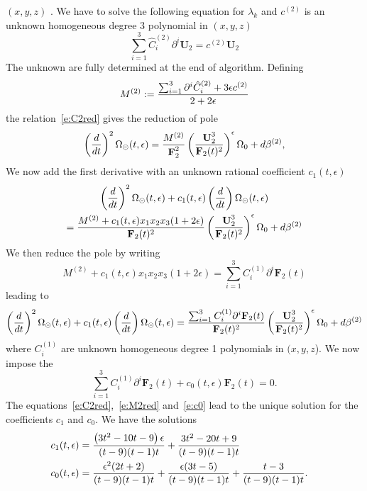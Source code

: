 \documentclass[a4paper,12pt]{article}
\numberwithin{equation}{section}
\numberwithin{figure}{section}
\def\su{\circleddash}
\begin{document}
$(x,y,z)$ .
We have to solve the following equation for $\lambda_k$  and $c^{(2)}$ is an unknown homogeneous degree 3 polynomial
in $(x,y,z)$
\begin{equation}\label{e:C2red}
  \sum_{i=1}^3 \hat C_i^{(2)} \partial^i \textbf{U}_2 = c^{(2)} \textbf{U}_2
\end{equation}
The unknown are fully determined at the end of  algorithm.
Defining 
\begin{equation}
  \label{e:M2}
  M^{(2)}:={\sum_{i=1}^3 \partial^i \hat C_i^{(2)}+3\epsilon
    c^{(2)}\over 2+2\epsilon}
\end{equation}
the relation~\eqref{e:C2red} gives the reduction of pole
\begin{equation}
 \left(d\over dt\right)^2
 \Omega_\su(t,\epsilon)=
{M^{(2)}\over
     \textbf{F}_2^{2}}\left(\textbf{U}_2^3\over \textbf{F}_2(t)^2\right)^\epsilon \Omega_0+d\beta^{(2)},
 \end{equation}
%
We now add the first derivative with an unknown rational coefficient $c_1(t,\epsilon)$
\begin{multline}
 \left(d\over dt\right)^2
 \Omega_\su(t,\epsilon) +c_1(t,\epsilon) \left(d\over dt\right)
 \Omega_\su(t,\epsilon) \cr=
{M^{(2)}+c_1(t,\epsilon) x_1x_2x_3(1+2\epsilon)\over
     \textbf{F}_2(t)^{2}}\left(\textbf{U}_2^3\over \textbf{F}_2(t)^2\right)^\epsilon \Omega_0+d\beta^{(2)}
 \end{multline}
 We then reduce the pole by writing
 \begin{equation}\label{e:M2red}
   M^{(2)}+ c_1(t,\epsilon) x_1x_2x_3(1+2\epsilon)= \sum_{i=1}^3
   C_i^{(1)} \partial^i \textbf{F}_2(t)
 \end{equation}
leading to
\begin{equation}
 \left(d\over dt\right)^2
 \Omega_\su(t,\epsilon) +c_1(t,\epsilon) \left(d\over dt\right)
 \Omega_\su(t,\epsilon) =
{ \sum_{i=1}^3
   C_i^{(1)} \partial^i \textbf{F}_2(t)\over
     \textbf{F}_2(t)^{2}}\left(\textbf{U}_2^3\over \textbf{F}_2(t)^2\right)^\epsilon \Omega_0+d\beta^{(2)}
 \end{equation}
 where $ C_i^{(1)}$ are unknown homogeneous degree 1 polynomials in $(x,y,z$).
We now impose the 
\begin{equation}\label{e:c0}
  \sum_{i=1}^3C_i^{(1)}\partial^i \textbf{F}_2(t)+ c_0(t,\epsilon) \textbf{F}_2 (t) =0.
\end{equation}
%
The equations~\eqref{e:C2red},~\eqref{e:M2red} and~\eqref{e:c0} lead
to the unique solution for the coefficients $c_1$ and $c_0$.
We have the solutions
\begin{align}
  c_1(t,\epsilon)&=\frac{\left(3 t^2-10 t-9\right) \epsilon }{(t-9) (t-1) t}+\frac{3 t^2-20 t+9}{(t-9) (t-1)
   t}\cr
  c_0(t,\epsilon)&=\frac{\epsilon ^2 (2 t+2)}{(t-9) (t-1) t}+\frac{\epsilon  (3 t-5)}{(t-9) (t-1)
   t}+\frac{t-3}{(t-9) (t-1) t}  .
\end{align}
\end{document}
